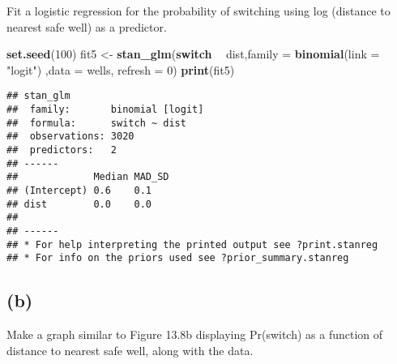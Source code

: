 \documentclass[
]{article}
\newenvironment{Shaded}{\begin{snugshade}}{\end{snugshade}}
\newcommand{\CommentTok}[1]{\textcolor[rgb]{0.56,0.35,0.01}{\textit{#1}}}
\newcommand{\ControlFlowTok}[1]{\textcolor[rgb]{0.13,0.29,0.53}{\textbf{#1}}}
\newcommand{\DataTypeTok}[1]{\textcolor[rgb]{0.13,0.29,0.53}{#1}}
\newcommand{\DecValTok}[1]{\textcolor[rgb]{0.00,0.00,0.81}{#1}}
\newcommand{\FloatTok}[1]{\textcolor[rgb]{0.00,0.00,0.81}{#1}}
\newcommand{\KeywordTok}[1]{\textcolor[rgb]{0.13,0.29,0.53}{\textbf{#1}}}
\newcommand{\NormalTok}[1]{#1}
\newcommand{\OperatorTok}[1]{\textcolor[rgb]{0.81,0.36,0.00}{\textbf{#1}}}
\newcommand{\OtherTok}[1]{\textcolor[rgb]{0.56,0.35,0.01}{#1}}
\newcommand{\StringTok}[1]{\textcolor[rgb]{0.31,0.60,0.02}{#1}}
\begin{document}
Fit a logistic regression for the probability of switching using log
(distance to nearest safe well) as a predictor.

\begin{Shaded}
\begin{Highlighting}[]
\KeywordTok{set.seed}\NormalTok{(}\DecValTok{100}\NormalTok{)}
\NormalTok{fit5 <-}\StringTok{ }\KeywordTok{stan_glm}\NormalTok{(}\ControlFlowTok{switch} \OperatorTok{~}\StringTok{ }\NormalTok{dist,}\DataTypeTok{family =} \KeywordTok{binomial}\NormalTok{(}\DataTypeTok{link =} \StringTok{"logit"}\NormalTok{) ,}\DataTypeTok{data =}\NormalTok{ wells, }\DataTypeTok{refresh =} \DecValTok{0}\NormalTok{)}
\KeywordTok{print}\NormalTok{(fit5)}
\end{Highlighting}
\end{Shaded}

\begin{verbatim}
## stan_glm
##  family:       binomial [logit]
##  formula:      switch ~ dist
##  observations: 3020
##  predictors:   2
## ------
##             Median MAD_SD
## (Intercept) 0.6    0.1   
## dist        0.0    0.0   
## 
## ------
## * For help interpreting the printed output see ?print.stanreg
## * For info on the priors used see ?prior_summary.stanreg
\end{verbatim}

\hypertarget{b-4}{%
\subsection{(b)}\label{b-4}}

Make a graph similar to Figure 13.8b displaying Pr(switch) as a function
of distance to nearest safe well, along with the data.

\begin{Shaded}
\end{Shaded}
\end{document}
